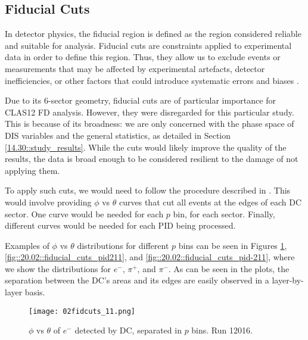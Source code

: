 \subsection{Fiducial Cuts}
\label{20.02::fiducial_cuts}
    In detector physics, the fiducial region is defined as the region considered reliable and suitable for analysis.
    Fiducial cuts are constraints applied to experimental data in order to define this region.
    Thus, they allow us to exclude events or measurements that may be affected by experimental artefacts, detector inefficiencies, or other factors that could introduce systematic errors and biases \cite{leo1987}.

    Due to its 6-sector geometry, fiducial cuts are of particular importance for CLAS12 FD analysis.
    However, they were disregarded for this particular study.
    This is because of its broadness: we are only concerned with the phase space of DIS variables and the general statistics, as detailed in Section \ref{14.30::study_results}.
    While the cuts would likely improve the quality of the results, the data is broad enough to be considered resilient to the damage of not applying them.

    To apply such cuts, we would need to follow the procedure described in \cite{zana2010}.
    This would involve providing $\phi$ vs $\theta$ curves that cut all events at the edges of each DC sector.
    One curve would be needed for each $p$ bin, for each sector.
    Finally, different curves would be needed for each PID being processed.

    Examples of $\phi$ vs $\theta$ distributions for different $p$ bins can be seen in Figures \ref{fig::20.02::fiducial_cuts_pid11}, \ref{fig::20.02::fiducial_cuts_pid211}, and \ref{fig::20.02::fiducial_cuts_pid-211}, where we show the distributions for $e^-$, $\pi^+$, and $\pi^-$.
    As can be seen in the plots, the separation between the DC's areas and its edges are easily observed in a layer-by-layer basis.

    \begin{figure}[b!]
        \centering
        \texttt{[image: 02fidcuts\_11.png]}
        \caption[$\phi$ vs $\theta$ of $e^-$ in $p$ bins]
        {$\phi$ vs $\theta$ of $e^-$ detected by DC, separated in $p$ bins.
        Run 12016.}
        \label{fig::20.02::fiducial_cuts_pid11}
    \end{figure}

